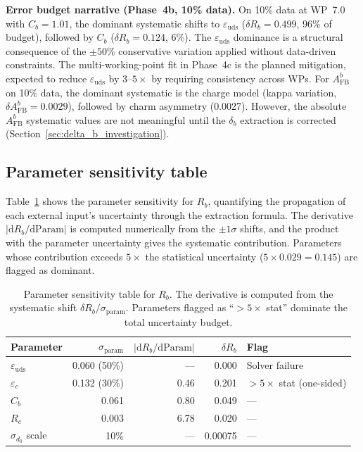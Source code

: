 \documentclass[11pt,a4paper]{article}
\begin{document}
\textbf{Error budget narrative (Phase~4b, 10\% data).} On 10\% data at WP~7.0
with $C_b = 1.01$, the dominant systematic shifts to $\varepsilon_\mathrm{uds}$
($\delta R_b = 0.499$, 96\% of budget), followed by $C_b$ ($\delta R_b = 0.124$, 6\%).
The $\varepsilon_\mathrm{uds}$ dominance is a structural consequence of the
$\pm 50\%$ conservative variation applied without data-driven constraints. The
multi-working-point fit in Phase~4c is the planned mitigation, expected to reduce
$\varepsilon_\mathrm{uds}$ by $3$--$5\times$ by requiring consistency across WPs.
For $A_\mathrm{FB}^b$ on 10\% data, the dominant systematic is the charge model
(kappa variation, $\delta A_\mathrm{FB}^b = 0.0029$), followed by charm asymmetry
(0.0027). However, the absolute $A_\mathrm{FB}^b$ systematic values are not
meaningful until the $\delta_b$ extraction is corrected
(Section~\ref{sec:delta_b_investigation}).

\subsection{Parameter sensitivity table}
\label{sec:sensitivity}

Table~\ref{tab:sensitivity} shows the parameter sensitivity for $R_b$,
quantifying the propagation of each external input's uncertainty through the
extraction formula. The derivative $|\mathrm{d}R_b/\mathrm{d}\mathrm{Param}|$ is
computed numerically from the $\pm 1\sigma$ shifts, and the product with the
parameter uncertainty gives the systematic contribution. Parameters whose
contribution exceeds $5\times$ the statistical uncertainty ($5 \times 0.029 = 0.145$)
are flagged as dominant.

\begin{table}[htbp]
\centering
\caption{Parameter sensitivity table for $R_b$. The derivative is computed from the
systematic shift $\delta R_b / \sigma_\mathrm{param}$. Parameters flagged as
``$> 5\times$ stat'' dominate the total uncertainty budget.}
\label{tab:sensitivity}
\small
\begin{tabular}{lrrrl}
\toprule
Parameter & $\sigma_\mathrm{param}$ & $|\mathrm{d}R_b/\mathrm{d}\mathrm{Param}|$ & $\delta R_b$ & Flag \\
\midrule
$\varepsilon_\mathrm{uds}$ & 0.060 (50\%) & --- & 0.000 & Solver failure \\
$\varepsilon_c$ & 0.132 (30\%) & 0.46 & 0.201 & $> 5\times$ stat (one-sided) \\
$C_b$ & 0.061 & 0.80 & 0.049 & --- \\
$R_c$ & 0.003 & 6.78 & 0.020 & --- \\
$\sigma_{d_0}$ scale & 10\% & --- & 0.00075 & --- \\
\bottomrule
\end{tabular}
\end{table}
\end{document}
